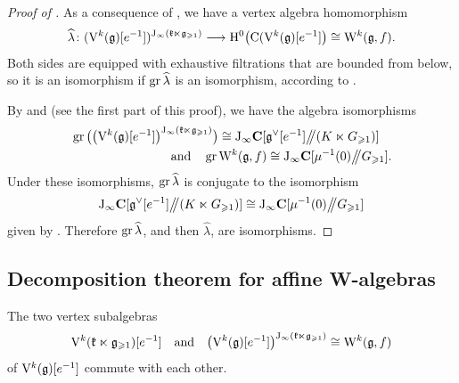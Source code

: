 \begin{proof}[Proof of ]
	As a consequence of , we have a vertex algebra homomorphism
	\[ \widehat\lambda \colon (\mathrm V^k(\mathfrak g)[e^{-1}])^{\mathrm{J}_\infty(\mathfrak k \ltimes \mathfrak g_{\geqslant 1})} \longrightarrow \mathrm{H}^0\big(\mathrm{C}(\mathrm V^k(\mathfrak g)[e^{-1}]\big) \cong \mathrm W^k(\mathfrak g, f). \]
	Both sides are equipped with exhaustive filtrations that are bounded from below, so it is an isomorphism if $\operatorname{gr} \widehat\lambda$ is an isomorphism, according to . 
	
	By  and  (see the first part of this proof), we have the algebra isomorphisms
	\[ \begin{multlined}
		\gr \big(\big(\V^k(\g)[e^{-1}]\big)^{\J_\infty(\kfk \ltimes \g_{\geqslant 1})}\big) \cong \J_\infty \C[\g^\vee[e^{-1}] \git (K \ltimes G_{\geqslant 1})] \\ \text{and} \quad \gr \W^k(\g, f) \cong \J_\infty \C[\mu^{-1}(0) \git G_{\geqslant 1}]. 
	\end{multlined}\]
	Under these isomorphisms, $\operatorname{gr} \widehat\lambda$ is conjugate to the isomorphism
	\[ \mathrm{J}_\infty \mathbf{C}[\mathfrak g^\vee[e^{-1}] \big/\!\!\big/ (K \ltimes G_{\geqslant 1})] \cong  \mathrm{J}_\infty \mathbf{C}[\mu^{-1}(0) \big/\!\!\big/ G_{\geqslant 1}] \]
	given by . Therefore $\operatorname{gr} \widehat\lambda$, and then $\widehat\lambda$, are isomorphisms.
\end{proof}



\subsection{Decomposition theorem for affine W-algebras}

\begin{lemma}
	The two vertex subalgebras 
	\[ \mathrm V^k(\mathfrak k \ltimes \mathfrak g_{\geqslant 1})[e^{-1}] \quad \text{and} \quad \big(\mathrm V^k(\mathfrak g)[e^{-1}]\big)^{\mathrm{J}_\infty(\mathfrak k \ltimes \mathfrak g_{\geqslant 1})} \cong \mathrm W^k(\mathfrak g, f) \]
	of $\mathrm V^k(\mathfrak g)[e^{-1}]$ commute with each other.
\end{lemma}

